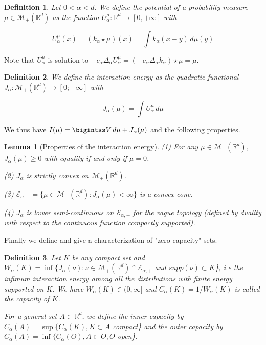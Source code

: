 \documentclass[a4paper,12pt]{report}
\newtheorem*{lem}{Lemma}
\newtheorem*{deft}{Definition}
\begin{document}
\begin{deft} 

Let $0 < \alpha < d$. We define the potential of a probability measure $\mu \in \mathcal{M}_{+}(\mathbb{R}^{d})$ as the function $U_{\alpha}^{\mu} : \mathbb{R}^{d} \longrightarrow [0, +\infty]$ with

\[U_{\alpha}^{\mu}(x) = (k_{\alpha} \star \mu)(x) = \int k_{\alpha}(x-y)\,d\mu(y)\]
\end{deft}

Note that $U_{\alpha}^{\mu}$ is solution to $-c_{\alpha} \Delta_{\alpha} U_{\alpha}^{\mu} = (-c_{\alpha} \Delta_{\alpha} k_{\alpha})\star \mu = \mu$.

\begin{deft}

We define the interaction energy as the quadratic functional $J_{\alpha} : \mathcal{M}_{+}(\mathbb{R}^{d}) \longrightarrow [0; + \infty]$ with 

\[J_{\alpha}(\mu) = \int U_{\alpha}^{\mu}\,d\mu\]
\end{deft}

We thus have $I(\mu) = \bigintss V\,d\mu + J_{\alpha}(\mu)$ and the following properties.

\begin{lem}[Properties of the interaction energy]

(1) For any $\mu \in \mathcal{M}_{+}(\mathbb{R}^{d})$, $J_{\alpha}(\mu) \geq 0$ with equality if and only if $\mu = 0$.

(2) $J_{\alpha}$ is strictly convex on $\mathcal{M}_{+}(\mathbb{R}^{d})$.

(3) $\mathcal{E}_{\alpha, +} = \{\mu \in  \mathcal{M}_{+}(\mathbb{R}^{d}) : J_{\alpha}(\mu) < \infty\}$ is a convex cone.

(4) $J_{\alpha}$ is lower semi-continuous on $\mathcal{E}_{\alpha, +}$ for the vague topology (defined by duality with respect to the continuous function compactly supported).
\end{lem}

Finally we define and give a characterization of "zero-capacity" sets.

\begin{deft}

Let $K$ be any compact set and $W_{\alpha}(K) = \inf \{J_{\alpha}(\nu) : \nu \in \mathcal{M}_{+}(\mathbb{R}^{d}) \cap \mathcal{E}_{\alpha, +}$ and $supp(\nu) \subset K$\}, i.e the infimum interaction energy among all the distributions with finite energy supported on $K$. We have $W_{\alpha}(K) \in (0, \infty]$ and $C_{\alpha}(K) = 1/W_{\alpha}(K)$ is called the capacity of $K$.
\vspace{0.5cm}

For a general set $A \subset \mathbb{R}^{d}$, we define the inner capacity by $C_{\alpha}(A)  = \sup\{C_{\alpha}(K), K \subset A$ compact\} and the outer capacity by $\overline C_{\alpha}(A) = \inf \{C_{\alpha}(O), A \subset O, O$ open\}.
\end{deft}
\end{document}
